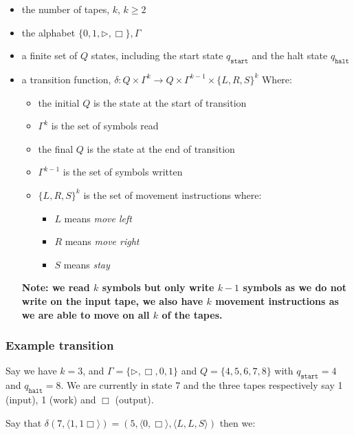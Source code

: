 \documentclass{article}
\begin{document}
\begin{itemize}
  \item the number of tapes, $k$, $k \geq 2$
  \item the alphabet $\{ 0,1,\rhd,\Box \}, \Gamma $
  \item a finite set of $Q$ states, including the start state $q_{\texttt{start} }$ and the halt state $q_{\texttt{halt} }$
  \item a transition function, $\delta: Q \times \Gamma^{k} \rightarrow Q \times \Gamma^{k-1}\times \{ L,R,S \}^{k} $
        Where:
        \begin{itemize}
          \item the initial $Q$ is the state at the start of transition
          \item $\Gamma^{k}$ is the set of symbols read
          \item the final $Q$ is the state at the end of transition
          \item $\Gamma^{k-1}$ is the set of symbols written
          \item $\{ L,R,S \}^{k} $ is the set of movement instructions where:
                \begin{itemize}
                  \item $L$ means \textit{move left}
                  \item $R$ means \textit{move right}
                  \item $S$ means \textit{stay}
                \end{itemize}
        \end{itemize}

        \textbf{Note: we read $k$ symbols but only write $k-1$ symbols as we do not write on the input tape, we also have $k$ movement instructions as we are able to move on all $k$ of the tapes.}
\end{itemize}

\subsubsection{Example transition}

Say we have $k=3$, and $\Gamma = \{ \rhd, \Box, 0 ,1 \} $ and $Q = \{ 4,5,6,7,8 \} $ with $q_{\texttt{start} } = 4$ and $q_{\texttt{halt} } = 8$.
We are currently in state 7 and the three tapes respectively say 1 (input), 1 (work) and $\Box$ (output).

Say that $\delta(7, \langle 1,1 \Box \rangle ) = (5, \langle 0, \Box \rangle , \langle L,L,S \rangle )$ then we:
\end{document}
